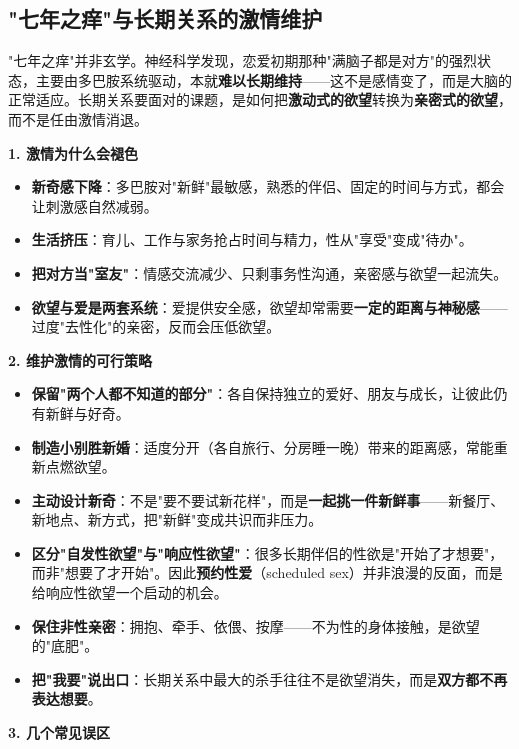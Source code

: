 \subsection{"七年之痒"与长期关系的激情维护}

"七年之痒"并非玄学。神经科学发现，恋爱初期那种"满脑子都是对方"的强烈状态，主要由多巴胺系统驱动，本就\textbf{难以长期维持}——这不是感情变了，而是大脑的正常适应。长期关系要面对的课题，是如何把\textbf{激动式的欲望}转换为\textbf{亲密式的欲望}，而不是任由激情消退。

\vspace{0.5em}
\noindent\textbf{1. 激情为什么会褪色}

\begin{itemize}
	\item \textbf{新奇感下降}：多巴胺对"新鲜"最敏感，熟悉的伴侣、固定的时间与方式，都会让刺激感自然减弱。
	\item \textbf{生活挤压}：育儿、工作与家务抢占时间与精力，性从"享受"变成"待办"。
	\item \textbf{把对方当"室友"}：情感交流减少、只剩事务性沟通，亲密感与欲望一起流失。
	\item \textbf{欲望与爱是两套系统}：爱提供安全感，欲望却常需要\textbf{一定的距离与神秘感}——过度"去性化"的亲密，反而会压低欲望。
\end{itemize}

\noindent\textbf{2. 维护激情的可行策略}

\begin{itemize}
	\item \textbf{保留"两个人都不知道的部分"}：各自保持独立的爱好、朋友与成长，让彼此仍有新鲜与好奇。
	\item \textbf{制造小别胜新婚}：适度分开（各自旅行、分房睡一晚）带来的距离感，常能重新点燃欲望。
	\item \textbf{主动设计新奇}：不是"要不要试新花样"，而是\textbf{一起挑一件新鲜事}——新餐厅、新地点、新方式，把"新鲜"变成共识而非压力。
	\item \textbf{区分"自发性欲望"与"响应性欲望"}：很多长期伴侣的性欲是"开始了才想要"，而非"想要了才开始"。因此\textbf{预约性爱}（scheduled sex）并非浪漫的反面，而是给响应性欲望一个启动的机会。
	\item \textbf{保住非性亲密}：拥抱、牵手、依偎、按摩——不为性的身体接触，是欲望的"底肥"。
	\item \textbf{把"我要"说出口}：长期关系中最大的杀手往往不是欲望消失，而是\textbf{双方都不再表达想要}。
\end{itemize}

\noindent\textbf{3. 几个常见误区}

